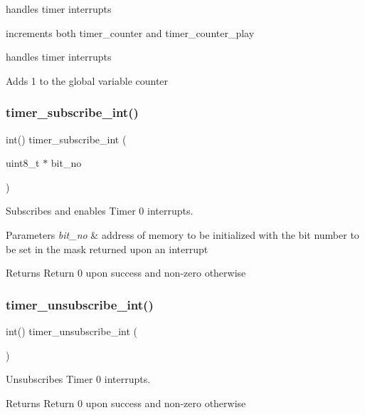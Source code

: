 handles timer interrupts 

increments both timer\+\_\+counter and timer\+\_\+counter\+\_\+play

handles timer interrupts

Adds 1 to the global variable counter \mbox{\label{group__Timer_gac57a7e1140a7e00ad95ac5488d2a671b}} 
\subsubsection{\texorpdfstring{timer\+\_\+subscribe\+\_\+int()}{timer\_subscribe\_int()}}
{\footnotesize\ttfamily int() timer\+\_\+subscribe\+\_\+int (\begin{DoxyParamCaption}\item[{uint8\+\_\+t $\ast$}]{bit\+\_\+no }\end{DoxyParamCaption})}



Subscribes and enables Timer 0 interrupts. 


\begin{DoxyParams}{Parameters}
{\em bit\+\_\+no} & address of memory to be initialized with the bit number to be set in the mask returned upon an interrupt \\
\hline
\end{DoxyParams}
\begin{DoxyReturn}{Returns}
Return 0 upon success and non-\/zero otherwise 
\end{DoxyReturn}
\mbox{\label{group__Timer_gafabd21de449be154dd65d5fdb2d8045d}} 
\subsubsection{\texorpdfstring{timer\+\_\+unsubscribe\+\_\+int()}{timer\_unsubscribe\_int()}}
{\footnotesize\ttfamily int() timer\+\_\+unsubscribe\+\_\+int (\begin{DoxyParamCaption}{ }\end{DoxyParamCaption})}



Unsubscribes Timer 0 interrupts. 

\begin{DoxyReturn}{Returns}
Return 0 upon success and non-\/zero otherwise 
\end{DoxyReturn}
